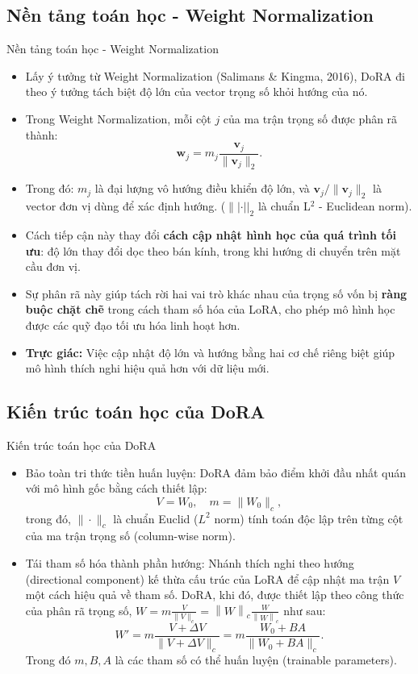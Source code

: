 \documentclass[11pt,aspectratio=169]{beamer}
\begin{document}
\subsection{Nền tảng toán học - Weight Normalization}
\begin{frame}[t]{Nền tảng toán học - Weight Normalization}
\footnotesize
\begin{itemize}
\item Lấy ý tưởng từ Weight Normalization (Salimans
\& Kingma, 2016), DoRA đi theo ý tưởng tách biệt độ lớn của vector trọng số khỏi hướng của nó.
\item Trong Weight Normalization, mỗi cột $j$ của ma trận trọng số được phân rã thành:
$$
\bm{w}_j = m_j \frac{\bm{v}_j}{\|\bm{v}_j\|_2}.
$$
\item Trong đó: $m_j$ là đại lượng vô hướng điều khiển độ lớn, và $\bm{v}_j/\|\bm{v}_j\|_2$ là vector đơn vị dùng để xác định hướng. ($\||\cdot||_2$ là chuẩn L$^2$ - Euclidean norm).
\item Cách tiếp cận này thay đổi \textbf{cách cập nhật hình học của quá trình tối ưu}: độ lớn thay đổi dọc theo bán kính, trong khi hướng di chuyển trên mặt cầu đơn vị.
\item Sự phân rã này giúp tách rời hai vai trò khác nhau của trọng số vốn bị \textbf{ràng buộc chặt chẽ} trong cách tham số hóa của LoRA, cho phép mô hình học được các quỹ đạo tối ưu hóa linh hoạt hơn.
\item \textbf{Trực giác:} Việc cập nhật độ lớn và hướng bằng hai cơ chế riêng biệt giúp mô hình thích nghi hiệu quả hơn với dữ liệu mới.
\end{itemize}
\end{frame}




\subsection{Kiến trúc toán học của DoRA}
\begin{frame}[t]{Kiến trúc toán học của DoRA}
\scriptsize
\begin{itemize}
    \item Bảo toàn tri thức tiền huấn luyện: DoRA đảm bảo điểm khởi đầu nhất quán với mô hình gốc bằng cách thiết lập:$$V = W_0, \quad m = \|W_0\|_c,$$
trong đó, $\|\cdot\|_c$ là chuẩn Euclid ($L^2$ norm) tính toán độc lập trên từng cột của ma trận trọng số (column-wise norm).
    \item Tái tham số hóa thành phần hướng: Nhánh thích nghi theo hướng (directional component) kế thừa cấu trúc của LoRA để cập nhật ma trận $V$ một cách hiệu quả về tham số. DoRA, khi đó, được thiết lập theo công thức của phân rã trọng số, $W = m \frac{V}{\|V\|_c} = \left\|W\right\|_c \frac{W}{\left\|W\right\|_c}$
như sau:
$$W' = m \frac{V + \Delta V}{\|V + \Delta V\|_c} = m \frac{W_0 + BA}{\|W_0 + BA\|_c}.$$
Trong đó $m, B, A$ là các tham số có thể huấn luyện (trainable parameters).

\end{itemize}
\end{frame}
\end{document}
